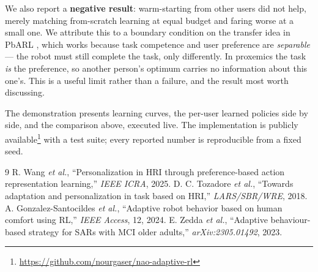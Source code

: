 \documentclass[conference,a4paper]{IEEEtran}
\begin{document}
We also report a \textbf{negative result}: warm-starting from other users did not
help, merely matching from-scratch learning at equal budget and faring worse at a
small one. We attribute this to a boundary condition on the transfer idea in PbARL
\cite{wang2025}, which works because task competence and user preference are
\emph{separable} --- the robot must still complete the task, only differently. In
proxemics the task \emph{is} the preference, so another person's optimum carries no
information about this one's. This is a useful limit rather than a failure, and the
result most worth discussing.

The demonstration presents learning curves, the per-user learned policies side by
side, and the comparison above, executed live. The implementation is publicly
available\footnote{\url{https://github.com/nourgaser/nao-adaptive-rl}} with a test
suite; every reported number is reproducible from a fixed seed.

\vspace{-0.5em}
\begin{thebibliography}{9}
\scriptsize
\setlength{\itemsep}{0pt}
 R. Wang \textit{et al.}, ``Personalization in HRI through preference-based action representation learning,'' \textit{IEEE ICRA}, 2025.
 D. C. Tozadore \textit{et al.}, ``Towards adaptation and personalization in task based on HRI,'' \textit{LARS/SBR/WRE}, 2018.
 A. Gonzalez-Santocildes \textit{et al.}, ``Adaptive robot behavior based on human comfort using RL,'' \textit{IEEE Access}, 12, 2024.
 E. Zedda \textit{et al.}, ``Adaptive behaviour-based strategy for SARs with MCI older adults,'' \textit{arXiv:2305.01492}, 2023.
\end{thebibliography}
\end{document}
